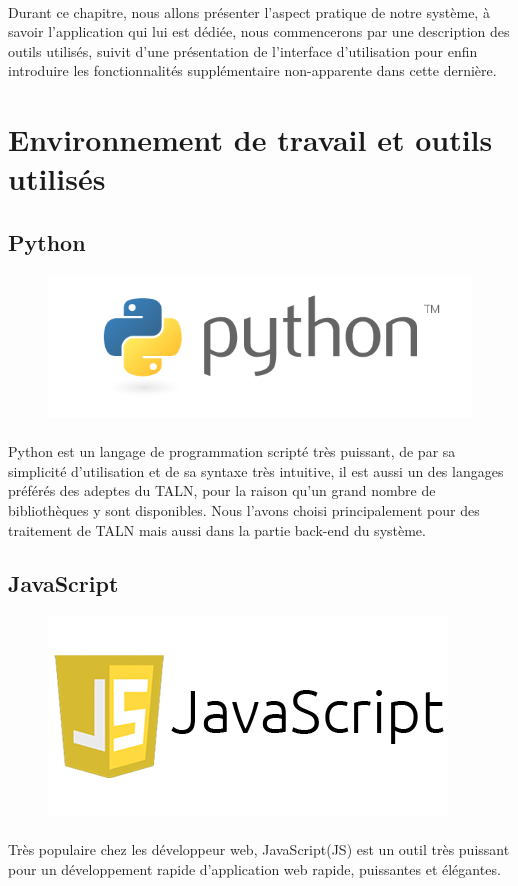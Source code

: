 \documentclass[]{report}
\begin{document}
		\paragraph{}
		Durant ce chapitre, nous allons présenter l'aspect pratique de notre système, à savoir l'application qui lui est dédiée, nous commencerons par une description des outils utilisés, suivit d'une présentation de l'interface d'utilisation pour enfin introduire les fonctionnalités supplémentaire non-apparente dans cette dernière.  
	\section{Environnement de travail et outils utilisés}
		\subsection{Python}
			\begin{figure}[H]
				\centering
				\includegraphics[width=0.25\linewidth]{images/python.png}
			\end{figure}
			\paragraph{}
			Python est un langage de programmation scripté très puissant, de par sa simplicité d'utilisation et de sa syntaxe
			très intuitive, il est aussi un des langages préférés des adeptes du TALN, pour la raison qu'un grand nombre de 
			bibliothèques y sont disponibles. Nous l'avons choisi principalement pour des traitement de TALN mais aussi dans la partie
			back-end  du système.
		\subsection{JavaScript}
			\begin{figure}[H]
				\centering
				\includegraphics[width=0.25\linewidth]{images/js.png}
			\end{figure}
			\paragraph{}
			Très populaire chez les développeur web, JavaScript(JS) est un outil très puissant pour un développement rapide d'application web rapide, puissantes et élégantes.
\end{document}
